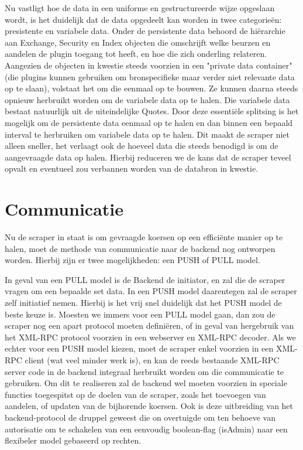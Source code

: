 Nu vastligt hoe de data in een uniforme en gestructureerde wijze opgeslaan wordt, is het duidelijk dat de data opgedeelt kan worden in twee categorie\"en: presistente en variabele data.
Onder de persistente data behoord de hi\"erarchie aan Exchange, Security en Index objecten die omschrijft welke beurzen en aandelen de plugin toegang tot heeft, en hoe die zich onderling relateren. Aangezien de objecten in kwestie steeds voorzien in een "private data container" (die plugins kunnen gebruiken om bronspecifieke maar verder niet relevante data op te slaan), volstaat het om die eenmaal op te bouwen. Ze kunnen daarna steeds opnieuw herbruikt worden om de variabele data op te halen. Die variabele data bestaat natuurlijk uit de uiteindelijke Quotes.
Door deze essenti\"ele splitsing is het mogelijk om de persistente data eenmaal op te halen en dan binnen een bepaald interval te herbruiken om variabele data op te halen. Dit maakt de scraper niet alleen sneller, het verlaagt ook de hoeveel data die steeds benodigd is om de aangevraagde data op halen. Hierbij reduceren we de kans dat de scraper teveel opvalt en eventueel zou verbannen worden van de databron in kwestie.

\section{Communicatie}

Nu de scraper in staat is om gevraagde koersen op een effici\"ente manier op te halen, moet de methode van communicatie naar de backend nog ontworpen worden. Hierbij zijn er twee mogelijkheden: een PUSH of PULL model.

In geval van een PULL model is de Backend de initiator, en zal die de scraper vragen om een bepaalde set data. In een PUSH model daarentegen zal de scraper zelf initiatief nemen. Hierbij is het vrij snel duidelijk dat het PUSH model de beste keuze is. Moesten we immers voor een PULL model gaan, dan zou de scraper nog een apart protocol moeten defini\"eren, of in geval van hergebruik van het XML-RPC protocol voorzien in een webserver en XML-RPC decoder. Als we echter voor een PUSH model kiezen, moet de scraper enkel voorzien in een XML-RPC client (wat veel minder werk is), en kan de reeds bestaande XML-RPC server code in de backend integraal herbruikt worden om die communicatie te gebruiken.
Om dit te realiseren zal de backend wel moeten voorzien in speciale functies toegespitst op de doelen van de scraper, zoals het toevoegen van aandelen, of updaten van de bijhorende koersen. Ook is deze uitbreiding van het backend-protocol de druppel geweest die on overtuigde om ten behoeve van autorisatie om te schakelen van een eenvoudig boolean-flag (isAdmin) naar een flexibeler model gebaseerd op rechten.


